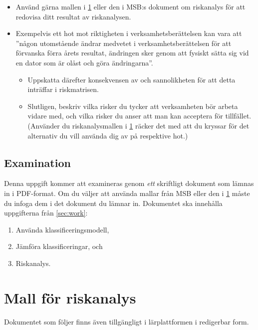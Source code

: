 \documentclass[a4paper]{llncs}
\begin{document}
\begin{framed}
\begin{itemize}
    \item Använd gärna mallen i \cref{app:riskanalys} eller den i MSB:s 
      dokument om riskanalys \cite[bilaga A]{MSB2011r} för att redovisa ditt 
      resultat av riskanalysen.
    \item Exempelvis ett hot mot riktigheten i verksamhetsberättelsen kan vara 
      att ''någon utomstående ändrar medvetet i verksamhetsberättelsen
      för att förvanska förra årets resultat, ändringen sker genom att
      fysiskt sätta sig vid en dator som är olåst och göra ändringarna''.
      \begin{itemize}
        \item Uppskatta därefter konsekvensen av och sannolikheten för att 
          detta inträffar i riskmatrisen.
        \item Slutligen, beskriv vilka risker du tycker att verksamheten bör 
          arbeta vidare med, och vilka risker du anser att man kan acceptera 
          för tillfället.
          (Använder du riskanalysmallen i \cref{app:riskanalys} räcker det 
          med att du kryssar för det alternativ du vill använda dig av på 
          respektive hot.)
      \end{itemize}
  \end{itemize}
\end{framed}

\subsection{Examination}
\label{sec:Examination}

Denna uppgift kommer att examineras genom \emph{ett} skriftligt dokument som 
lämnas in i PDF-format.
Om du väljer att använda mallar från MSB eller den i \cref{app:riskanalys} 
måste du infoga dem i det dokument du lämnar in.
Dokumentet ska innehålla uppgifterna från \cref{sec:work}:
\begin{enumerate}
  \item Använda klassificeringsmodell,
  \item Jämföra klassificeringar, och
  \item Riskanalys.
\end{enumerate}


\section{Mall för riskanalys}
\label{app:riskanalys}

Dokumentet som följer finns även tillgängligt i lärplattformen i redigerbar 
form.


\end{document}
